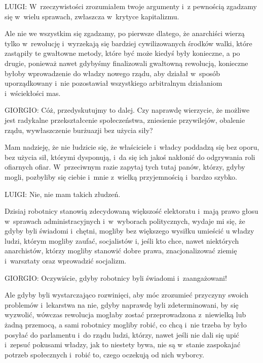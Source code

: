 \documentclass[oneside,polish,11pt,sfheadings]{mwbk}
\begin{document}
 
\noindent LUIGI: W~rzeczywistości zrozumiałem twoje argumenty i~z pewnością zgadzamy się w~wielu sprawach, zwłaszcza w~krytyce
kapitalizmu. 

 
Ale nie we wszystkim się zgadzamy, po pierwsze dlatego, że anarchiści wierzą tylko w~rewolucję i~wyrzekają się bardziej
cywilizowanych środków walki, które zastąpiły te gwałtowne metody, które być może kiedyś były konieczne, a po drugie,
ponieważ nawet gdybyśmy finalizowali gwałtowną rewolucją, konieczne byłoby wprowadzenie do władzy nowego rządu, aby
działał w~sposób uporządkowany i~nie pozostawiał wszystkiego arbitralnym działaniom i~wściekłości mas. 




 
\noindent GIORGIO: Cóż, przedyskutujmy to dalej. Czy naprawdę wierzycie, że możliwe jest radykalne przekształcenie społeczeństwa,
zniesienie przywilejów, obalenie rządu, wywłaszczenie burżuazji bez użycia siły? 

 
Mam nadzieję, że nie łudzicie się, że właściciele i~władcy poddadzą się bez oporu, bez użycia sił, którymi dysponują, i~da się ich jakoś nakłonić do odgrywania roli ofiarnych ofiar. W~przeciwnym razie zapytaj tych tutaj panów, którzy,
gdyby mogli, pozbyliby się ciebie i~mnie z~wielką przyjemnością i~bardzo szybko. 




 
\noindent LUIGI: Nie, nie mam takich złudzeń. 

 
Dzisiaj robotnicy stanowią zdecydowaną większość elektoratu i~mają prawo głosu w~sprawach administracyjnych i~w~wyborach
politycznych, wydaje mi się, że gdyby byli świadomi i~chętni, mogliby bez większego wysiłku umieścić u władzy ludzi,
którym mogliby zaufać, socjalistów i, jeśli kto chce, nawet niektórych anarchistów, którzy mogliby stanowić dobre
prawa, znacjonalizować ziemię i~warsztaty oraz wprowadzić socjalizm. 




 
\noindent GIORGIO: Oczywiście, gdyby robotnicy byli świadomi i~zaangażowani! 

 
Ale gdyby byli wystarczająco rozwinięci, aby móc zrozumieć przyczyny swoich problemów i~lekarstwa na nie, gdyby naprawdę
byli zdeterminowani, by się wyzwolić, wówczas rewolucja mogłaby zostać przeprowadzona z~niewielką lub żadną przemocą, a
sami robotnicy mogliby robić, co chcą i~nie trzeba by było posyłać do parlamentu i~do rządu ludzi, którzy, nawet jeśli
nie dali się upić i~zepsuć pokusami władzy, jak to niestety bywa, nie są w~stanie zaspokajać potrzeb społecznych i~robić to, czego oczekują od nich wyborcy. 
\end{document}
